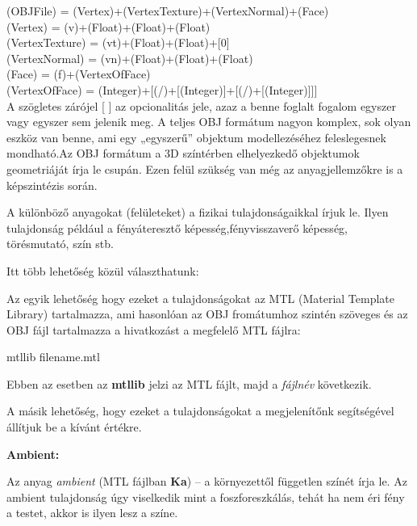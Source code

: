 \noindent(OBJFile) = {(Vertex)}+{(VertexTexture)}+{(VertexNormal)}+{(Face)}\\
(Vertex) = (v)+(Float)+(Float)+(Float)\\
(VertexTexture) = (vt)+(Float)+(Float)+[0]\\
(VertexNormal) = (vn)+(Float)+(Float)+(Float)\\
(Face) = (f)+{(VertexOfFace)}\\
(VertexOfFace) = (Integer)+[(/)+[(Integer)]+[(/)+[(Integer)]]]\\

A szögletes zárójel [ ] az opcionalitás jele, azaz a benne foglalt fogalom egyszer vagy egyszer sem jelenik meg. A teljes OBJ formátum nagyon komplex, sok olyan eszköz van benne, ami egy „egyszerű” objektum modellezéséhez feleslegesnek mondható.Az OBJ formátum a 3D színtérben elhelyezkedő objektumok geometriáját írja le csupán. Ezen felül szükség van még az anyagjellemzőkre is a képszintézis során.\newpage


A különböző anyagokat (felületeket) a fizikai tulajdonságaikkal írjuk le. Ilyen tulajdonság például a fényáteresztő képesség,fényvisszaverő képesség, törésmutató, szín stb. \newline

\noindent Itt több lehetőség közül választhatunk:\newline

Az egyik lehetőség hogy ezeket a tulajdonságokat az MTL (Material Template Library) tartalmazza, ami hasonlóan az OBJ fromátumhoz szintén szöveges és az OBJ fájl tartalmazza a hivatkozást a megfelelő MTL fájlra:
\begin{cpp} 
mtllib filename.mtl
\end{cpp}
Ebben az esetben az \textbf{mtllib} jelzi az MTL fájlt, majd a  \textsl{fájlnév} következik.\newline

A másik lehetőség, hogy ezeket a tulajdonságokat a megjelenítőnk segítségével állítjuk be a kívánt értékre.\newline

\noindent \textbf{Ambient:}

Az anyag \textsl{ambient} (MTL fájlban \textbf{Ka}) – a környezettől független színét írja le. Az ambient tulajdonság úgy viselkedik mint a foszforeszkálás, tehát ha nem éri fény a testet, akkor is ilyen lesz a színe.

